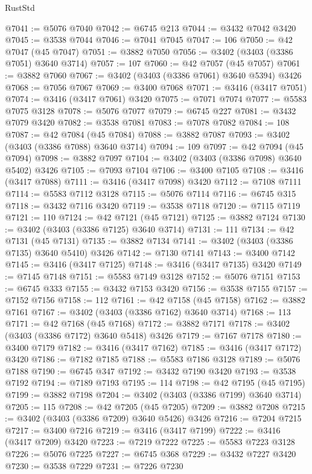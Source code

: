 \begin{lexlean}{RustStd}
\begin{coremodule}
@7041 := @5076 @7040
@7042 := @6745 @213
@7044 := @3432 @7042 @3420
@7045 := @3538 @7044
@7046 := @7041 @7045
@7047 := 106
@7050 := @42 @7047 (@45 @7047)
@7051 := @3882 @7050
@7056 := @3402 (@3403 (@3386 @7051) @3640 @3714)
@7057 := 107
@7060 := @42 @7057 (@45 @7057)
@7061 := @3882 @7060
@7067 := @3402 (@3403 (@3386 @7061) @3640 @5394) @3426
@7068 := @7056 @7067
@7069 := @3400 @7068
@7071 := @3416 (@3417 @7051)
@7074 := @3416 (@3417 @7061) @3420
@7075 := @7071 @7074
@7077 := @5583 @7075 @3128
@7078 := @5076 @7077
@7079 := @6745 @227
@7081 := @3432 @7079 @3420
@7082 := @3538 @7081
@7083 := @7078 @7082
@7084 := 108
@7087 := @42 @7084 (@45 @7084)
@7088 := @3882 @7087
@7093 := @3402 (@3403 (@3386 @7088) @3640 @3714)
@7094 := 109
@7097 := @42 @7094 (@45 @7094)
@7098 := @3882 @7097
@7104 := @3402 (@3403 (@3386 @7098) @3640 @5402) @3426
@7105 := @7093 @7104
@7106 := @3400 @7105
@7108 := @3416 (@3417 @7088)
@7111 := @3416 (@3417 @7098) @3420
@7112 := @7108 @7111
@7114 := @5583 @7112 @3128
@7115 := @5076 @7114
@7116 := @6745 @315
@7118 := @3432 @7116 @3420
@7119 := @3538 @7118
@7120 := @7115 @7119
@7121 := 110
@7124 := @42 @7121 (@45 @7121)
@7125 := @3882 @7124
@7130 := @3402 (@3403 (@3386 @7125) @3640 @3714)
@7131 := 111
@7134 := @42 @7131 (@45 @7131)
@7135 := @3882 @7134
@7141 := @3402 (@3403 (@3386 @7135) @3640 @5410) @3426
@7142 := @7130 @7141
@7143 := @3400 @7142
@7145 := @3416 (@3417 @7125)
@7148 := @3416 (@3417 @7135) @3420
@7149 := @7145 @7148
@7151 := @5583 @7149 @3128
@7152 := @5076 @7151
@7153 := @6745 @333
@7155 := @3432 @7153 @3420
@7156 := @3538 @7155
@7157 := @7152 @7156
@7158 := 112
@7161 := @42 @7158 (@45 @7158)
@7162 := @3882 @7161
@7167 := @3402 (@3403 (@3386 @7162) @3640 @3714)
@7168 := 113
@7171 := @42 @7168 (@45 @7168)
@7172 := @3882 @7171
@7178 := @3402 (@3403 (@3386 @7172) @3640 @5418) @3426
@7179 := @7167 @7178
@7180 := @3400 @7179
@7182 := @3416 (@3417 @7162)
@7185 := @3416 (@3417 @7172) @3420
@7186 := @7182 @7185
@7188 := @5583 @7186 @3128
@7189 := @5076 @7188
@7190 := @6745 @347
@7192 := @3432 @7190 @3420
@7193 := @3538 @7192
@7194 := @7189 @7193
@7195 := 114
@7198 := @42 @7195 (@45 @7195)
@7199 := @3882 @7198
@7204 := @3402 (@3403 (@3386 @7199) @3640 @3714)
@7205 := 115
@7208 := @42 @7205 (@45 @7205)
@7209 := @3882 @7208
@7215 := @3402 (@3403 (@3386 @7209) @3640 @5426) @3426
@7216 := @7204 @7215
@7217 := @3400 @7216
@7219 := @3416 (@3417 @7199)
@7222 := @3416 (@3417 @7209) @3420
@7223 := @7219 @7222
@7225 := @5583 @7223 @3128
@7226 := @5076 @7225
@7227 := @6745 @368
@7229 := @3432 @7227 @3420
@7230 := @3538 @7229
@7231 := @7226 @7230

\end{coremodule}
\end{lexlean}
